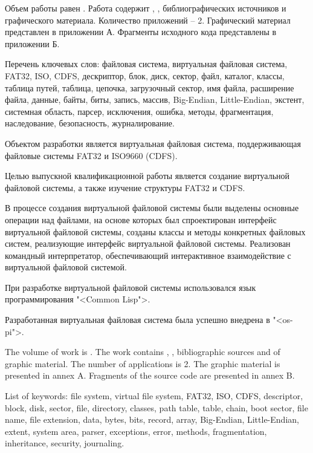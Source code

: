 
Объем работы равен . Работа содержит , ,  библиографических источников и  графического материала. Количество приложений – 2. Графический материал представлен в приложении А. Фрагменты исходного кода представлены в приложении Б.

Перечень ключевых слов: файловая система, виртуальная файловая система, FAT32, ISO, CDFS, дескриптор, блок, диск, сектор, файл, каталог, классы, таблица путей, таблица, цепочка, загрузочный сектор, имя файла, расширение файла, данные, байты, биты, запись, массив, Big-Endian, Little-Endian, экстент, системная область, парсер, исключения, ошибка, методы, фрагментация, наследование, безопасность, журналирование.

Объектом разработки является виртуальная файловая система, поддерживающая файловые системы FAT32 и ISO9660 (CDFS).

Целью выпускной квалификационной работы является создание виртуальной файловой системы, а также изучение структуры FAT32 и CDFS.

В процессе создания виртуальной файловой системы были выделены основные операции над файлами, на основе которых был спроектирован интерфейс виртуальной файловой системы, созданы классы и методы конкретных файловых систем, реализующие интерфейс виртуальной файловой системы. Реализован командный интерпретатор, обеспечивающий интерактивное взаимодействие с виртуальной файловой системой.

При разработке виртуальной файловой системы использовался язык программирования "<Common Lisp">.

Разработанная виртуальная файловая система была успешно внедрена в "<os-pi">.

  
The volume of work is . The work contains , ,  bibliographic sources and  of graphic material. The number of applications is 2. The graphic material is presented in annex A. Fragments of the source code are presented in annex B.

List of keywords: file system, virtual file system, FAT32, ISO, CDFS, descriptor, block, disk, sector, file, directory, classes, path table, table, chain, boot sector, file name, file extension, data, bytes, bits, record, array, Big-Endian, Little-Endian, extent, system area, parser, exceptions, error, methods, fragmentation, inheritance, security, journaling.

